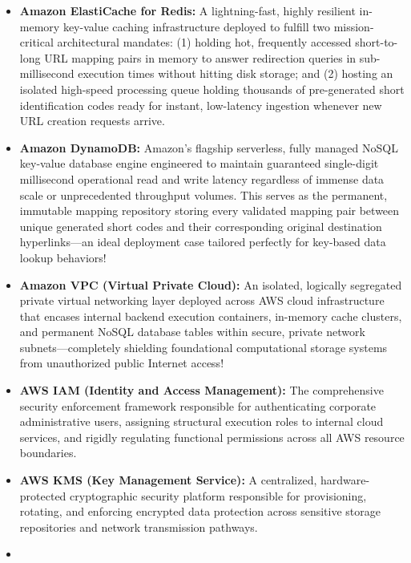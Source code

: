 \begin{itemize}
  engineers to manually provision, update, patch, or scale bare-metal
  virtual compute server clusters, enabling effortless container scaling
  that tracks real-time traffic demand.
\item
  \textbf{Amazon ElastiCache for Redis:} A lightning-fast, highly
  resilient in-memory key-value caching infrastructure deployed to
  fulfill two mission-critical architectural mandates: (1) holding hot,
  frequently accessed short-to-long URL mapping pairs in memory to
  answer redirection queries in sub-millisecond execution times without
  hitting disk storage; and (2) hosting an isolated high-speed
  processing queue holding thousands of pre-generated short
  identification codes ready for instant, low-latency ingestion whenever
  new URL creation requests arrive.
\item
  \textbf{Amazon DynamoDB:} Amazon's flagship serverless, fully managed
  NoSQL key-value database engine engineered to maintain guaranteed
  single-digit millisecond operational read and write latency regardless
  of immense data scale or unprecedented throughput volumes. This serves
  as the permanent, immutable mapping repository storing every validated
  mapping pair between unique generated short codes and their
  corresponding original destination hyperlinks---an ideal deployment
  case tailored perfectly for key-based data lookup behaviors!
\item
  \textbf{Amazon VPC (Virtual Private Cloud):} An isolated, logically
  segregated private virtual networking layer deployed across AWS cloud
  infrastructure that encases internal backend execution containers,
  in-memory cache clusters, and permanent NoSQL database tables within
  secure, private network subnets---completely shielding foundational
  computational storage systems from unauthorized public Internet
  access!
\item
  \textbf{AWS IAM (Identity and Access Management):} The comprehensive
  security enforcement framework responsible for authenticating
  corporate administrative users, assigning structural execution roles
  to internal cloud services, and rigidly regulating functional
  permissions across all AWS resource boundaries.
\item
  \textbf{AWS KMS (Key Management Service):} A centralized,
  hardware-protected cryptographic security platform responsible for
  provisioning, rotating, and enforcing encrypted data protection across
  sensitive storage repositories and network transmission pathways.
\item

\end{itemize}
